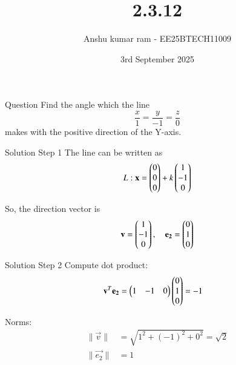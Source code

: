\documentclass{beamer}
\title{2.3.12}
\date{3rd September 2025}
\author{Anshu kumar ram - EE25BTECH11009}
\begin{document}
\frame{\titlepage}

\begin{frame}{Question}
Find the angle which the line
\[
\frac{x}{1} = \frac{y}{-1} = \frac{z}{0}
\]
makes with the positive direction of the Y-axis.
\end{frame}

\begin{frame}{Solution Step 1}
The line can be written as
\[
L : \mathbf{x} = \begin{pmatrix}0\\0\\0\end{pmatrix} + k\begin{pmatrix}1\\-1\\0\end{pmatrix}
\]

So, the direction vector is
\[
\mathbf{v} = \begin{pmatrix}1\\-1\\0\end{pmatrix}, \quad 
\mathbf{e_2} = \begin{pmatrix}0\\1\\0\end{pmatrix}
\]
\end{frame}

\begin{frame}{Solution Step 2}
Compute dot product:
\begin{align}
\mathbf{v}^T \mathbf{e_2} &= \begin{pmatrix}1 & -1 & 0\end{pmatrix}\begin{pmatrix}0\\1\\0\end{pmatrix} = -1
\end{align}

Norms:
\begin{align}
\|\vec{v}\| &= \sqrt{1^2 + (-1)^2 + 0^2} = \sqrt{2} \\
\|\vec{e_2}\| &= 1
\end{align}
\end{frame}
\end{document}
